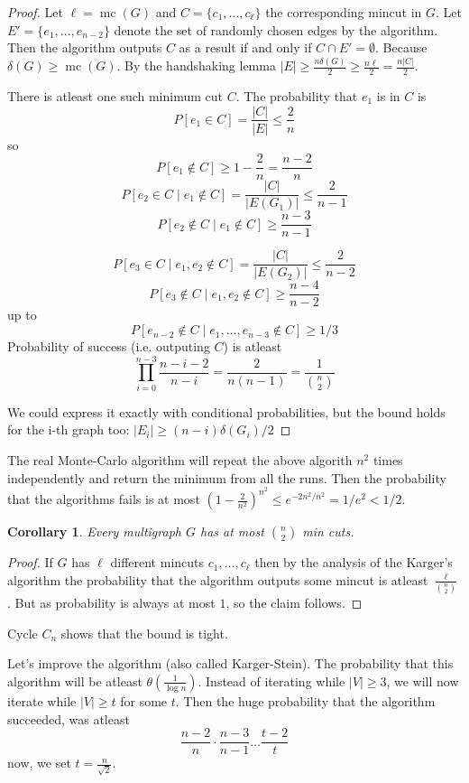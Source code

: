 \documentclass{article}
\theoremstyle{plain}
\newtheorem{dus}[thm]{Corollary}
\theoremstyle{definition}
\begin{document}
\begin{proof}
	Let $\ell=\operatorname{mc}(G)$ and $C=\{c_1,\ldots,c_\ell\}$ the corresponding mincut in $G$. Let $E'=\{e_1,\ldots,e_{n-2}\}$ denote the set of randomly chosen edges by the algorithm. Then the algorithm outputs $C$ as a result if and only if $C\cap E'=\emptyset$. Because $\delta(G)\geq \operatorname{mc}(G)$. By the handshaking lemma $|E| \geq \frac{n\delta(G)}{2}\geq \frac{n\ell}{2}=\frac{n|C|}{2}$.
	
	There is atleast one such minimum cut $C$. The probability that $e_1$ is in $C$ is $$P[e_1\in C]=\frac{|C|}{|E|}\leq \frac{2}{n}$$
	so
	$$
	P[e_1\notin C]\geq 1 - \frac{2}{n}=\frac{n-2}{n}
	$$
	$$
	P[e_2\in C \mid e_1\notin C] = \frac{|C|}{|E(G_1)|}\leq \frac{2}{n-1}
	$$
	$$
	P[e_2\notin C \mid e_1\notin C]\geq \frac{n-3}{n-1}
	$$
	
	$$
	P[e_3\in C \mid e_1,e_2\notin C] = \frac{|C|}{|E(G_2)|}\leq \frac{2}{n-2}
	$$
	$$
	P[e_3\notin C \mid e_1,e_2\notin C]\geq \frac{n-4}{n-2}
	$$
	up to
	$$
	P[e_{n-2}\notin C \mid e_1,\ldots, e_{n-3}\notin C] \geq 1/3
	$$
	Probability of success (i.e. outputing $C$) is atleast
	$$
	\prod_{i=0}^{n-3}\frac{n-i-2}{n-i} = \frac{2}{n(n-1)}=\frac{1}{{n\choose 2}}
	$$
	
	We could express it exactly with conditional probabilities, but the bound holds for the i-th graph too: $|E_i|\geq (n-i)\delta(G_i)/2$
\end{proof}


The real Monte-Carlo algorithm will repeat the above algorith $n^2$ times independently and return the minimum from all the runs. Then the probability that the algorithms fails is at most $(1-\frac{2}{n^2})^{n^2}\leq e ^{-2n^2/n^2}=1/e^2<1/2$.

\begin{dus}
	Every multigraph $G$ has at most $n\choose 2$ min cuts.
\end{dus}
\begin{proof}
	If $G$ has $\ell$ different mincuts $c_1,\ldots, c_\ell$ then by the analysis of the Karger's algorithm the probability that the algorithm outputs some mincut is atleast
	$\frac{\ell}{{n\choose 2}}$. But as probability is always at most $1$, so the claim follows.
\end{proof}

Cycle $C_n$ shows that the bound is tight.

Let's improve the algorithm (also called Karger-Stein). The probability that this algorithm will be atleast $\theta(\frac{1}{\log n})$. Instead of iterating while $|V|\geq 3$, we will now iterate while $|V|\geq t$ for some $t$. Then the huge probability that the algorithm succeeded, was atleast
$$
\frac{n-2}{n}\cdot \frac{n-3}{n-1}\ldots \frac{t-2}{t}
$$
now, we set $t=\frac{n}{\sqrt{2}}$.
\end{document}

